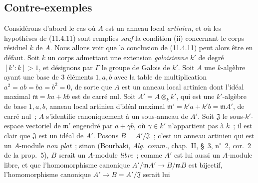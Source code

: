 \subsection{Contre-exemples}
\label{subsection:IV.11.7-fr}

\begin{env}[11.7.1]
\label{IV.11.7.1-fr}
Considérons d'abord le cas où $A$ est un anneau local \emph{artinien}, et où les
hypothèses de (11.4.11) sont remplies \emph{sauf} la condition (ii) concernant
le corps résiduel $k$ de $A$. Nous allons voir que la conclusion de (11.4.11)
peut alors être en défaut. Soit $k$ un corps admettant une extension
\emph{galoisienne} $k'$ de degré $[k':k]>1$, et désignons par $\Gamma$ le groupe
de Galois de $k'$. Soit $A$ une $k$-algèbre ayant une base de 3 éléments
$1,a,b$ avec la table de multiplication $a^2=ab=ba=b^2=0$, de sorte que $A$ est
un anneau local artinien dont l'idéal maximal $\mathfrak m=ka+kb$ est de carré
nul. Soit $A'=A\otimes_k k'$, qui est une $k'$-algèbre de base $1,a,b$, anneau
local artinien d'idéal maximal
$\mathfrak m'=k'a+k'b=\mathfrak m A'$, de carré nul~; $A$ s'identifie
canoniquement à un sous-anneau de $A'$. Soit $\mathfrak J$ le sous-$k'$-espace
vectoriel de $\mathfrak m'$ engendré par $a+\gamma b$, où $\gamma\in k'$
n'appartient pas à $k$~; il est clair que $\mathfrak J$ est un idéal de $A'$.
Posons $B=A'/\mathfrak J$~; c'est un anneau artinien qui est un $A$-module
\emph{non plat}~; sinon (Bourbaki, \emph{Alg. comm.}, chap.~II, \S~3,
n$^\circ$~2, cor.~2 de la prop.~5), $B$ serait un $A$-module \emph{libre}~;
comme $A'$ est lui aussi un $A$-module libre, et que l'homomorphisme canonique
$A'/\mathfrak m A'\to B/\mathfrak m B$ est bijectif, l'homomorphisme canonique
$A'\to B=A'/\mathfrak J$ serait lui



\end{env}
